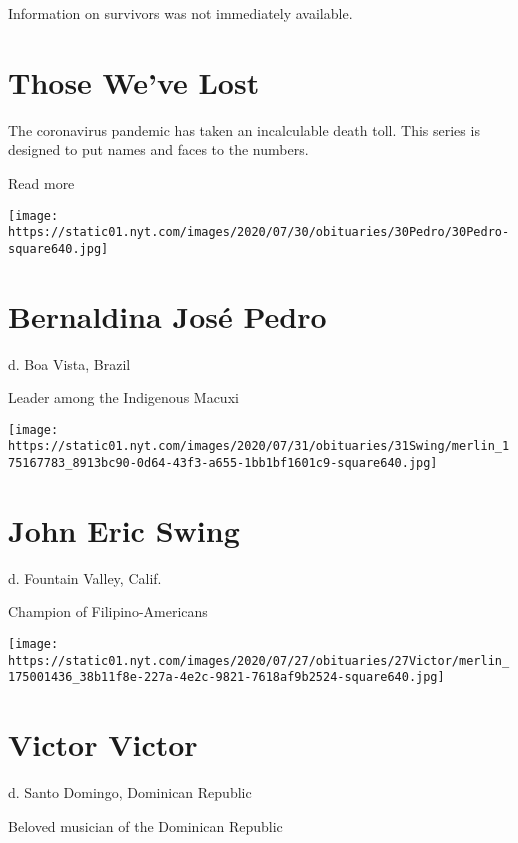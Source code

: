 Information on survivors was not immediately available.

\href{https://www.nytimes.com/interactive/2020/obituaries/people-died-coronavirus-obituaries.html?action=click\&pgtype=Article\&state=default\&region=BELOW_MAIN_CONTENT\&context=covid_obits_promo}{}

\hypertarget{those-weve-lost}{%
\section{Those We've Lost}\label{those-weve-lost}}

The coronavirus pandemic has taken an incalculable death toll. This
series is designed to put names and faces to the numbers.

Read more

\texttt{[image: https://static01.nyt.com/images/2020/07/30/obituaries/30Pedro/30Pedro-square640.jpg]}

\hypertarget{bernaldina-josuxe9-pedro}{%
\section{Bernaldina José Pedro}\label{bernaldina-josuxe9-pedro}}

d. Boa Vista, Brazil

Leader among the Indigenous Macuxi

\texttt{[image: https://static01.nyt.com/images/2020/07/31/obituaries/31Swing/merlin\_175167783\_8913bc90-0d64-43f3-a655-1bb1bf1601c9-square640.jpg]}

\hypertarget{john-eric-swing}{%
\section{John Eric Swing}\label{john-eric-swing}}

d. Fountain Valley, Calif.

Champion of Filipino-Americans

\texttt{[image: https://static01.nyt.com/images/2020/07/27/obituaries/27Victor/merlin\_175001436\_38b11f8e-227a-4e2c-9821-7618af9b2524-square640.jpg]}

\hypertarget{victor-victor}{%
\section{Victor Victor}\label{victor-victor}}

d. Santo Domingo, Dominican Republic

Beloved musician of the Dominican Republic

